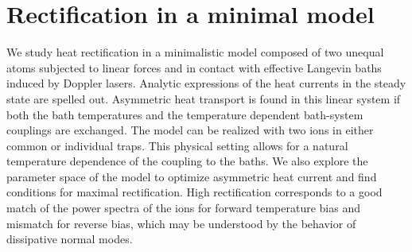 
\chapter{Rectification in a minimal model}
\label{Chapter6}
%
We study heat rectification in a minimalistic model composed of two unequal atoms subjected to linear forces and in contact with effective Langevin baths
induced by Doppler lasers. Analytic expressions of the heat currents in the steady state are spelled out. Asymmetric heat transport is found in this linear system if both the bath temperatures and the temperature dependent bath-system couplings are exchanged. The model can be realized with two ions  in  either common or individual traps. This physical setting allows for a natural temperature
dependence of the coupling to the baths.
We also explore the parameter space of the model to optimize asymmetric heat current and find
conditions for maximal rectification. High rectification corresponds to a good match of the power spectra of the ions for forward temperature bias and
mismatch  for reverse bias, which may be understood by the behavior of dissipative normal modes.
%
\newpage
%

